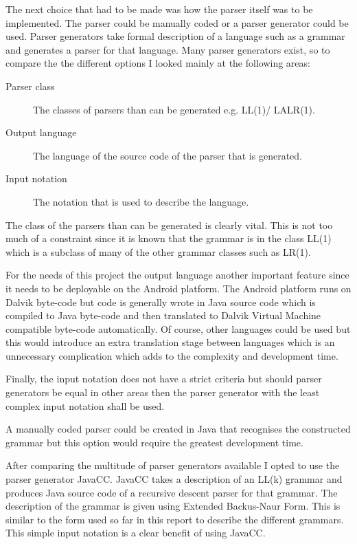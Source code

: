 The next choice that had to be made was how the parser itself was to be implemented. The parser could be manually coded or a parser generator could be used. Parser generators take formal description of a language such as a grammar and generates a parser for that language. Many parser generators exist, so to compare the the different options I looked mainly at the following areas:
\begin{description}
\item[Parser class] The classes of parsers than can be generated e.g. LL(1)/ LALR(1).
\item[Output language] The language of the source code of the parser that is generated.
\item[Input notation] The notation that is used to describe the language.
\end{description}

The class of the parsers than can be generated is clearly vital. This is not too much of a constraint since it is known that the grammar is in the class LL(1) which is a subclass of many of the other grammar classes such as LR(1).

For the needs of this project the output language another important feature since it needs to be deployable on the Android platform. The Android platform runs on Dalvik byte-code but code is generally wrote in Java source code which is compiled to Java byte-code and then translated to Dalvik Virtual Machine compatible byte-code automatically. Of course, other languages could be used but this would introduce an extra translation stage between languages which is an unnecessary complication which adds to the complexity and development time. 

Finally, the input notation does not have a strict criteria but should parser generators be equal in other areas then the parser generator with the least complex input notation shall be used.

A manually coded parser could be created in Java that recognises the constructed grammar but this option would require the greatest development time.

After comparing the multitude of parser generators available I opted to use the parser generator JavaCC. JavaCC takes a description of an LL(k) grammar and produces Java source code of a recursive descent parser for that grammar. The description of the grammar is given using Extended Backus-Naur Form. This is similar to the form used so far in this report to describe the different grammars. This simple input notation is a clear benefit of using JavaCC.

